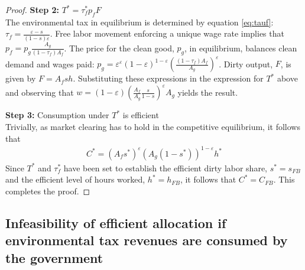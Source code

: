\begin{proof}
\textbf{Step 2:} $T^*=\tau_f^*p_fF$\\
The environmental tax in equilibrium is determined by equation \ref{eq:tauf}: $\tau_f = \frac{\varepsilon-s}{(1-s)\varepsilon}$. Free labor movement enforcing a unique wage rate implies that $p_f=p_g\frac{A_g}{(1-\tau_f)A_f}$. The price for the clean good, $p_g$, in equilibrium, balances clean demand and wages paid: $p_g=\varepsilon^\varepsilon(1-\varepsilon)^{1-\varepsilon}\left(\frac{(1-\tau_f)A_f}{A_g}\right)^\varepsilon$. Dirty output, $F$, is given by $F=A_fsh$. 
Substituting these expressions in the expression for $T^*$ above and observing that $w=(1-\varepsilon)\left(\frac{A_f}{A_g}\frac{s}{1-s}\right)^\varepsilon A_g$ yields the result.

\textbf{Step 3: } Consumption under $T^*$ is efficient\\
Trivially, as market clearing has to hold in the competitive equilibrium, it follows that 
\begin{align}
C^*=\left(A_f s^*\right)^\varepsilon\left(A_g(1-s^*)\right)^{1-\varepsilon}h^*
\end{align} 
Since $T^*$ and $\tau_f^*$ have been set to establish the efficient dirty labor share, $s^*=s_{FB}$ and the efficient level of hours worked, $h^*=h_{FB}$, it follows that $C^*=C_{FB}$. This completes the proof.
\end{proof}

\subsection{Infeasibility of efficient allocation if environmental tax revenues are consumed by the government}

